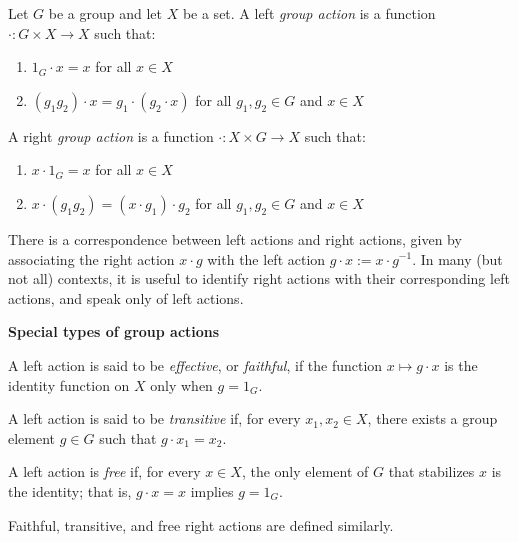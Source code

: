 \documentclass[12pt]{article}
\begin{document}
Let $G$ be a group and let $X$ be a set. A left {\em group action} is a function $\cdot: G \times X \longrightarrow X$ such that:
\begin{enumerate}
\item $1_G \cdot x = x$ for all $x \in X$
\item $(g_1 g_2)\cdot x = g_1 \cdot (g_2 \cdot x)$ for all $g_1, g_2 \in G$ and $x \in X$
\end{enumerate}

A right {\em group action} is a function $\cdot: X \times G \longrightarrow X$ such that:
\begin{enumerate}
\item $x \cdot 1_G = x$ for all $x \in X$
\item $x \cdot (g_1 g_2) = (x \cdot g_1) \cdot g_2$ for all $g_1, g_2 \in G$ and $x \in X$
\end{enumerate}

There is a correspondence between left actions and right actions, given by associating the right action $x \cdot g$ with the left action $g \cdot x := x \cdot g^{-1}$. In many (but not all) contexts, it is useful to identify right actions with their corresponding left actions, and speak only of left actions.

{\bf Special types of group actions}

A left action is said to be {\em effective}, or {\em faithful}, if the function $x \mapsto g \cdot x$ is the identity function on $X$ only when $g = 1_G$.

A left action is said to be {\em transitive} if, for every $x_1,x_2 \in X$, there exists a group element $g \in G$ such that $g \cdot x_1 = x_2$.

A left action is {\em free} if, for every $x \in X$, the only element of $G$ that stabilizes $x$ is the identity; that is, $g \cdot x = x$ implies $g = 1_G$.

Faithful, transitive, and free right actions are defined similarly.
\end{document}
